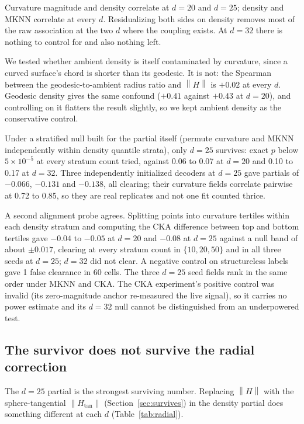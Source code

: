 \documentclass[11pt,a4paper]{article}
\newcommand{\Htan}{H_{\mathrm{tan}}}
\newcommand{\norm}[1]{\left\lVert #1 \right\rVert}
\begin{document}
Curvature magnitude and density correlate at $d = 20$ and $d = 25$; density and MKNN correlate at every $d$. Residualizing both sides on density removes most of the raw association at the two $d$ where the coupling exists. At $d = 32$ there is nothing to control for and also nothing left.

We tested whether ambient density is itself contaminated by curvature, since a curved surface's chord is shorter than its geodesic. It is not: the Spearman between the geodesic-to-ambient radius ratio and $\norm{H}$ is $+0.02$ at every $d$. Geodesic density gives the same confound ($+0.41$ against $+0.43$ at $d = 20$), and controlling on it flatters the result slightly, so we kept ambient density as the conservative control.

Under a stratified null built for the partial itself (permute curvature and MKNN independently within density quantile strata), only $d = 25$ survives: exact $p$ below $5\times10^{-5}$ at every stratum count tried, against 0.06 to 0.07 at $d = 20$ and 0.10 to 0.17 at $d = 32$. Three independently initialized decoders at $d = 25$ gave partials of $-0.066$, $-0.131$ and $-0.138$, all clearing; their curvature fields correlate pairwise at 0.72 to 0.85, so they are real replicates and not one fit counted thrice.

A second alignment probe agrees. Splitting points into curvature tertiles within each density stratum and computing the CKA difference between top and bottom tertiles gave $-0.04$ to $-0.05$ at $d = 20$ and $-0.08$ at $d = 25$ against a null band of about $\pm 0.017$, clearing at every stratum count in $\{10, 20, 50\}$ and in all three seeds at $d = 25$; $d = 32$ did not clear. A negative control on structureless labels gave 1 false clearance in 60 cells. The three $d = 25$ seed fields rank in the same order under MKNN and CKA. The CKA experiment's positive control was invalid (its zero-magnitude anchor re-measured the live signal), so it carries no power estimate and its $d = 32$ null cannot be distinguished from an underpowered test.

\subsection{The survivor does not survive the radial correction}
\label{sec:radial}

The $d = 25$ partial is the strongest surviving number. Replacing $\norm{H}$ with the sphere-tangential $\norm{\Htan}$ (Section~\ref{sec:survives}) in the density partial does something different at each $d$ (Table~\ref{tab:radial}).
\end{document}
